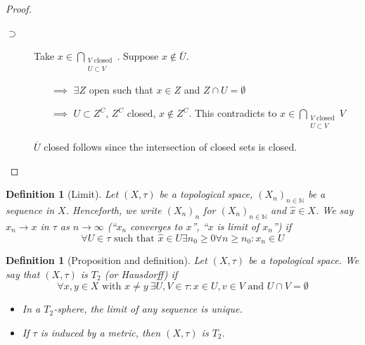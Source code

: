 \documentclass{article}
\newcounter{lecref}[section]
\numberwithin{lecref}{section}
\newtheorem{definition}[lecref]{Definition}
\begin{document}
\begin{proof}
\begin{enumerate}
\begin{description}
				\item[$\supset$]
					Take $x \in \bigcap_{\substack{V \text{ closed} \\ U \subset V}}$. Suppose $x \not\in \overline U$.
					\begin{itemize}
						\item[$\implies$] $\exists Z$ open such that $x \in Z$ and $Z \cap U = \emptyset$
						\item[$\implies$] $U \subset Z^C$, $Z^C$ closed, $x \not\in Z^C$. This contradicts to $x \in \bigcap_{\substack{V \text{ closed} \\ U \subset V}} V$
					\end{itemize}
					$\overline U$ closed follows since the intersection of closed sets is closed.
			\end{description}
	\end{enumerate}
\end{proof}

\begin{definition}[Limit]
	\label{definition:1.7}
	Let $(X, \tau)$ be a topological space, $(X_n)_{n \in \mathbb N}$ be a sequence in $X$. Henceforth, we write $(X_n)_{n}$ for $(X_n)_{n \in \mathbb N}$ and $\hat x \in X$. We say $x_n \to x$ in $\tau$ as $n \to \infty$ (\enquote{$x_n$ converges to $x$}, \enquote{$x$ is limit of $x_n$}) if
	\[ \forall U \in \tau \text{ such that } \hat x \in U \exists n_0 \geq 0 \forall n \geq n_0: x_n \in U \]
\end{definition}

\begin{definition}[Proposition and definition]
	\label{definition:1.8}
	Let $(X, \tau)$ be a topological space. We say that $(X, \tau)$ is $T_2$ (or Hausdorff) if 
	\[ \forall x, y \in X \text{ with } x \neq y \: \exists U, V \in \tau: x \in U, v \in V \text{ and } U \cap V = \emptyset \]
	\begin{itemize}
		\item In a $T_2$-sphere, the limit of any sequence is unique.
		\item If $\tau$ is induced by a metric, then $(X, \tau)$ is $T_2$.
	\end{itemize}
\end{definition}
\end{document}
